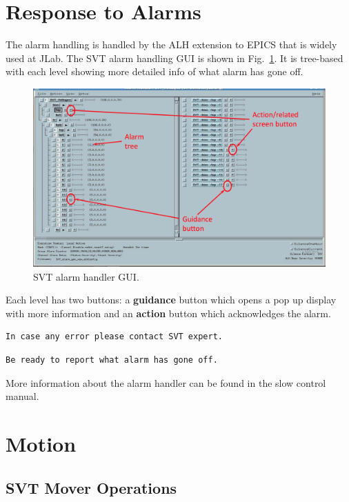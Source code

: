 \documentclass[12pt]{report}
\begin{document}
\section{Response to Alarms}

The alarm handling is handled by the ALH extension to EPICS that is widely used at JLab. The SVT alarm handling GUI is shown in Fig.~\ref{fig:svt_alarm_gui}. It is tree-based with each level showing more detailed info of what alarm has gone off. 
\begin{figure}[ht]
\includegraphics[width=12cm]{svt_alarm_gui}
\caption{SVT alarm handler GUI.\label{fig:svt_alarm_gui}}
\end{figure}

Each level has two buttons: a \textbf{guidance} button which opens a pop up display with more information and an \textbf{action} button which acknowledges the alarm. 

\begin{verbatim}
In case any error please contact SVT expert.
\end{verbatim}
\begin{verbatim}
Be ready to report what alarm has gone off.
\end{verbatim}

More information about the alarm handler can be found in the slow control manual. 



\section{Motion}

\subsection{SVT Mover Operations}
\end{document}
